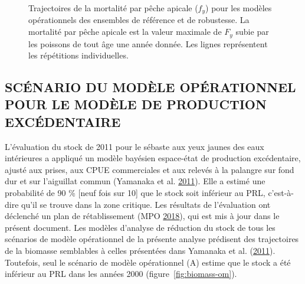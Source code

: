 \documentclass[french,11pt]{book}
\begin{document}
\begin{figure}[htb]

{\centering {} 

}

\caption{Trajectoires de la mortalité par pêche apicale (\(f_y\)) pour les modèles opérationnels des ensembles de référence et de robustesse. La mortalité par pêche apicale est la valeur maximale de \(F_y\) subie par les poissons de tout âge une année donnée. Les lignes représentent les répétitions individuelles.}\label{fig:F-om}
\end{figure}
\clearpage

\hypertarget{scuxe9nario-du-moduxe8le-opuxe9rationnel-pour-le-moduxe8le-de-production-excuxe9dentaire}{%
\subsection{SCÉNARIO DU MODÈLE OPÉRATIONNEL POUR LE MODÈLE DE PRODUCTION EXCÉDENTAIRE}\label{scuxe9nario-du-moduxe8le-opuxe9rationnel-pour-le-moduxe8le-de-production-excuxe9dentaire}}

L'évaluation du stock de 2011 pour le sébaste aux yeux jaunes des eaux intérieures a appliqué un modèle bayésien espace-état de production excédentaire, ajusté aux prises, aux CPUE commerciales et aux relevés à la palangre sur fond dur et sur l'aiguillat commun (Yamanaka et al. \protect\hyperlink{ref-yamanaka2011}{2011}). Elle a estimé une probabilité de 90 \% {[}neuf fois sur 10{]} que le stock soit inférieur au PRL, c'est-à-dire qu'il se trouve dans la zone critique. Les résultats de l'évaluation ont déclenché un plan de rétablissement (MPO \protect\hyperlink{ref-ifmp2018}{2018}), qui est mis à jour dans le présent document. Les modèles d'analyse de réduction du stock de tous les scénarios de modèle opérationnel de la présente analyse prédisent des trajectoires de la biomasse semblables à celles présentées dans Yamanaka et al. (\protect\hyperlink{ref-yamanaka2011}{2011}). Toutefois, seul le scénario de modèle opérationnel (A) estime que le stock a été inférieur au PRL dans les années 2000 (figure~\ref{fig:biomass-om}).
\end{document}
